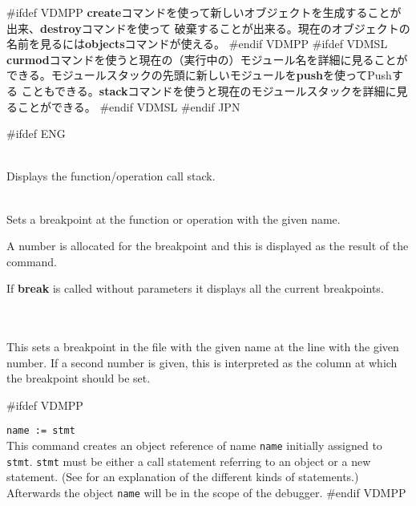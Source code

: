 \documentclass[\pformat,12pt]{article}
\begin{document}
#ifdef VDMPP
\textbf{create}コマンドを使って新しいオブジェクトを生成することが出来、\textbf{destroy}コマンドを使って
破棄することが出来る。現在のオブジェクトの名前を見るには\textbf{objects}コマンドが使える。
#endif VDMPP
#ifdef VDMSL
\textbf{curmod}コマンドを使うと現在の（実行中の）モジュール名を詳細に見ることが
できる。モジュールスタックの先頭に新しいモジュールを\textbf{push}を使ってPushする
こともできる。\textbf{stack}コマンドを使うと現在のモジュールスタックを詳細に見ることができる。
#endif VDMSL
#endif JPN

\begin{description}

#ifdef ENG
\item[*backtrace (bt)] \mbox{}\\
  Displays the function/operation
  call stack.
\item[*break (b) \mbox{[{\tt name }]}] 
\mbox{}\\
  Sets a breakpoint at the function or
  operation with the given name.
  
    
    A number is allocated for the  breakpoint and this is displayed
    as the result of the command.

    If \textbf{break} is called without parameters it displays all the
    current breakpoints.

\item[*break (b) \mbox{\texttt{name number} [\texttt{number}]}]\mbox{}\\
\mbox{}\\
 This sets a breakpoint in the file with the given name at the line
 with the given number. If a second number is given, this is
 interpreted as the column at which the breakpoint should be set.
 
#ifdef VDMPP
\item[*create (cr)] {\tt name := stmt}\mbox{}\\
  This command creates an object reference of name {\tt name}
  initially assigned to {\tt stmt}.  {\tt stmt} must be either a
  call statement referring to an object or a new statement. (See
  \cite{LangManPP-CSK} for an explanation of the different kinds of
  statements.)  Afterwards the object {\tt name} will be in the scope
  of the debugger.
#endif VDMPP


\end{description}
\end{document}
